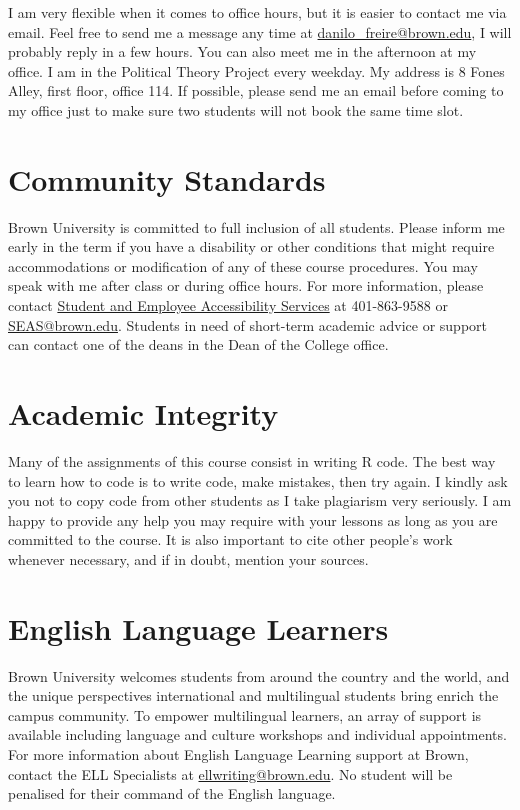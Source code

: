 \documentclass[a4paper,12pt]{article}
\begin{document}
 I am very flexible when it comes to office hours, but it is easier to contact me via email. Feel free to send me a message any time at \href{danilo_freire@brown.edu}{danilo\_freire@brown.edu}, I will probably reply in a few hours. You can also meet me in the afternoon at my office. I am in the Political Theory Project every weekday. My address is 8 Fones Alley, first floor, office 114. If possible, please send me an email before coming to my office just to make sure two students will not book the same time slot.

\section{Community Standards}%
\label{sec:community_standards}

Brown University is committed to full inclusion of all students. Please inform me early in the term if you have a disability or other conditions that might require accommodations or modification of any of these course procedures. You may speak with me after class or during office hours. For more information, please contact \href{https://www.brown.edu/campus-life/support/accessibility-services/}{Student and Employee Accessibility Services} at 401-863-9588 or \href{mailto:SEAS@brown.edu}{SEAS@brown.edu}. Students in need of short-term academic advice or support can contact one of the deans in the Dean of the College office.

\section{Academic Integrity}%
\label{sec:academic_integrity}

Many of the assignments of this course consist in writing R code. The best way to learn how to code is to write code, make mistakes, then try again. I kindly ask you not to copy code from other students as I take plagiarism very seriously. I am happy to provide any help you may require with your lessons as long as you are committed to the course. It is also important to cite other people's work whenever necessary, and if in doubt, mention your sources. 

\section{English Language Learners}%
\label{sec:english_language_learners}

Brown University welcomes students from around the country and the world, and the unique perspectives international and multilingual students bring enrich the campus community. To empower multilingual learners, an array of support is available including language and culture workshops and individual appointments. For more information about English Language Learning support at Brown, contact the ELL Specialists at \href{ellwriting@brown.edu}{ellwriting@brown.edu}. No student will be penalised for their command of the English language.
\end{document}
